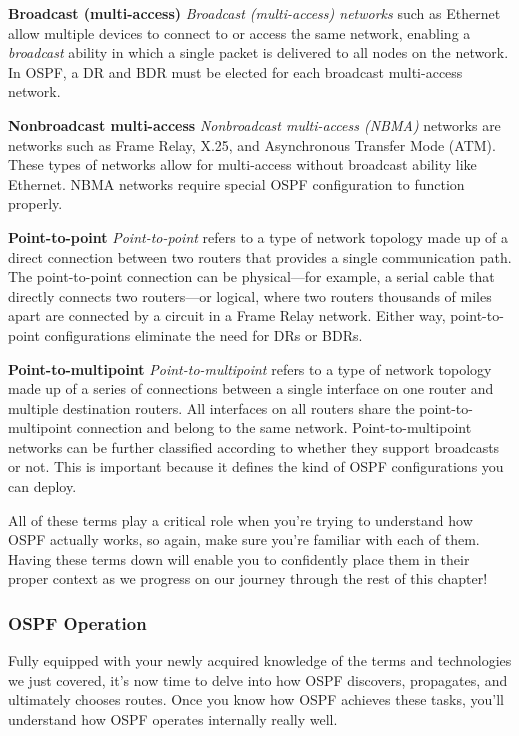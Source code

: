 \textbf{Broadcast (multi-access)} \emph{Broadcast (multi-access)
networks} such as Ethernet allow multiple devices to connect to or
access the same network, enabling a \emph{broadcast} ability in which a
single packet is delivered to all nodes on the network. In OSPF, a DR
and BDR must be elected for each broadcast multi-access network.

\textbf{Nonbroadcast multi-access} \emph{Nonbroadcast multi-access
(NBMA)} networks are networks such as Frame Relay, X.25, and
Asynchronous Transfer Mode (ATM). These types of networks allow for
multi-access without broadcast ability like Ethernet. NBMA networks
require special OSPF configuration to function properly.

\protect\hypertarget{c18.xhtmlux5cux23Page_751}{}{}\textbf{Point-to-point}
\emph{Point-to-point} refers to a type of network topology made up of a
direct connection between two routers that provides a single
communication path. The point-to-point connection can be physical---for
example, a serial cable that directly connects two routers---or logical,
where two routers thousands of miles apart are connected by a circuit in
a Frame Relay network. Either way, point-to-point configurations
eliminate the need for DRs or BDRs.

\textbf{Point-to-multipoint} \emph{Point-to-multipoint} refers to a type
of network topology made up of a series of connections between a single
interface on one router and multiple destination routers. All interfaces
on all routers share the point-to-multipoint connection and belong to
the same network. Point-to-multipoint networks can be further classified
according to whether they support broadcasts or not. This is important
because it defines the kind of OSPF configurations you can deploy.

All of these terms play a critical role when you're trying to understand
how OSPF actually works, so again, make sure you're familiar with each
of them. Having these terms down will enable you to confidently place
them in their proper context as we progress on our journey through the
rest of this chapter!

\subsubsection[OSPF
Operation]{\texorpdfstring{\protect\hypertarget{c18.xhtmlux5cux23c18-sec-3}{}{}OSPF
Operation}{OSPF Operation}}

Fully equipped with your newly acquired knowledge of the terms and
technologies we just covered, it's now time to delve into how OSPF
discovers, propagates, and ultimately chooses routes. Once you know how
OSPF achieves these tasks, you'll understand how OSPF operates
internally really well.


